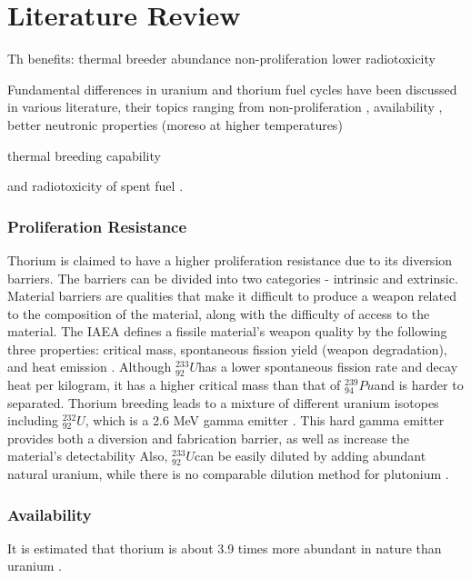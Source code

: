 \documentclass{article}
\newcommand{\uthree}{$^{233}_{92}U$}
\newcommand{\utwo}{$^{232}_{92}U$}
\newcommand{\pu}{$^{239}_{94}Pu$}
\begin{document}
\chapter{Literature Review}

Th benefits:
    thermal breeder
    abundance
    non-proliferation
    lower radiotoxicity


Fundamental differences in uranium and thorium fuel
cycles have been discussed in various literature,
their topics ranging from 
non-proliferation
\cite{iaea_thorium_2005} 
\cite{moir_recommendations_2008} 
\cite{kang_u-232_2001} %
,
availability
\cite{herring_uranium_2013}
,
better neutronic properties (moreso at higher temperatures)
\cite{lung_perspectives_1998}

thermal breeding capability
\cite{robertson_conceptual_1971}

and 
radiotoxicity of spent fuel
\cite{croff_comparative_2016}
.


\subsection{Proliferation Resistance}
Thorium is claimed to have a higher proliferation resistance
due to its diversion barriers. The barriers can be divided into
two categories - intrinsic and extrinsic. Material barriers
are qualities that make it difficult to produce a weapon related
to the composition of the material, along with the difficulty of
access to the material. The IAEA defines a fissile material's weapon
quality by the following three properties: critical mass, spontaneous 
fission yield (weapon degradation), and heat emission \cite{iaea_thoriuim_2005}.
Although \uthree has a lower spontaneous fission rate and decay heat per kilogram,
it has a higher critical mass than that of \pu and is harder to separated.
Thorium breeding leads to a mixture of different uranium isotopes including
\utwo, which is a 2.6 MeV gamma emitter \cite{moir_recommendations_2008}. This hard gamma emitter provides
both a diversion and fabrication barrier, as well as increase the material's detectability
Also, \uthree can be easily diluted by adding abundant natural uranium, while
there is no comparable dilution method for plutonium \cite{kang_u-232_2001}.


\subsection{Availability}
It is estimated that thorium is about 3.9 times more abundant in
nature than uranium \cite{herring_uranium_2013}. 
\end{document}
